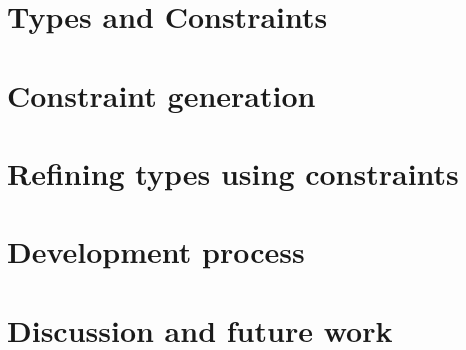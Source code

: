 \documentclass[a4paper]{article}
\begin{document}
\section{Types and Constraints}


\section{Constraint generation}


\section{Refining types using constraints}


\section{Development process}


\section{Discussion and future work}


\end{document}
